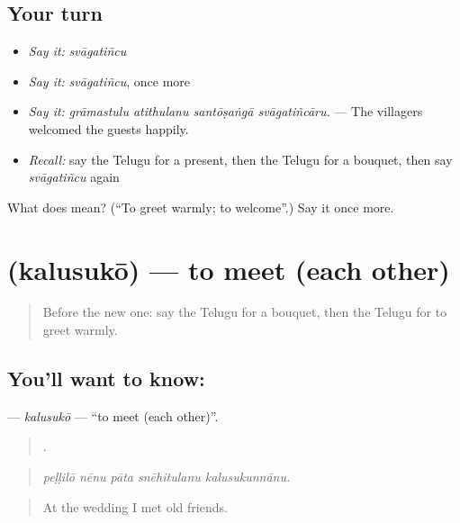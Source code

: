 \subsection*{Your turn}
\begin{itemize}
\raggedright
  \item \emph{Say it:} \emph{svāgatiñcu}
  \item \emph{Say it:} \emph{svāgatiñcu}, once more
  \item \emph{Say it:} \emph{grāmastulu atithulanu santōṣaṅgā svāgatiñcāru.} — The villagers welcomed the guests happily.
  \item \emph{Recall:} say the Telugu for a present, then the Telugu for a bouquet, then say \emph{svāgatiñcu} again
\end{itemize}

\begin{tcolorbox}[breakable,colback=teal!4,colframe=teal!35!black,title={Before you move on}]
What does  mean? (\textquotedblleft{}To greet warmly; to welcome\textquotedblright{}.) Say it once more.
\end{tcolorbox}
\section[\texorpdfstring{\te{కలుసుకో} (kalusukō)}{కలుసుకో (kalusukō)}]{ (kalusukō) — to meet (each other)}

\label{lesson:TE-C347-kalusuko}



\begin{quote}
Before the new one: say the Telugu for a bouquet, then the Telugu for to greet warmly.
\end{quote}

\subsection*{You'll want to know: }
\textbf{} — \emph{kalusukō} — \textquotedblleft{}to meet (each other)\textquotedblright{}.

\begin{quote}
    .
\end{quote}

\begin{quote}
\emph{peḷḷilō nēnu pāta snēhitulanu kalusukunnānu.}
\end{quote}

\begin{quote}
At the wedding I met old friends.
\end{quote}

